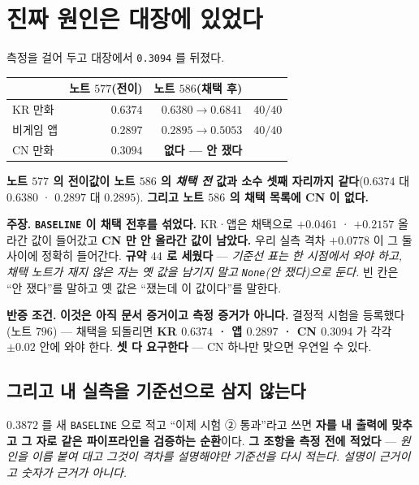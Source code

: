 \documentclass[10pt,a4paper]{article}
\newcommand{\claim}[2]{\begin{claimbox}\textbf{주장.} #1\par\smallskip
  \textcolor{gray!70}{\textbf{반증 조건.} #2}\end{claimbox}}
\begin{document}
\section{진짜 원인은 대장에 있었다}

측정을 걸어 두고 대장에서 \texttt{0.3094} 를 뒤졌다.

\begin{center}
\begin{tabular}{lrrl}
\toprule
& 노트 $577$(전이) & 노트 $586$(채택 후) & \\
\midrule
KR 만화 & $0.6374$ & $0.6380 \to \mathbf{0.6841}$ & $40/40$ \\
비게임 앱 & $0.2897$ & $0.2895 \to \mathbf{0.5053}$ & $40/40$ \\
\textcolor{BrickRed}{CN 만화} & $\mathbf{0.3094}$ & \textcolor{BrickRed}{\textbf{없다 --- 안 쟀다}} & \\
\bottomrule
\end{tabular}
\end{center}

\textbf{노트 $577$ 의 전이값이 노트 $586$ 의 \emph{채택 전} 값과 소수 셋째 자리까지
같다}($0.6374$ 대 $0.6380$ · $0.2897$ 대 $0.2895$). \textbf{그리고 노트 $586$ 의
채택 목록에 CN 이 없다.}

\claim{\textbf{\texttt{BASELINE} 이 채택 전후를 섞었다.} KR·앱은 채택으로
$+0.0461$ · $+0.2157$ 올라간 값이 들어갔고 \textbf{CN 만 안 올라간 값이 남았다.}
우리 실측 격차 $+0.0778$ 이 그 둘 사이에 정확히 들어간다. \textbf{규약 $44$ 로
세웠다} --- \emph{기준선 표는 한 시점에서 와야 하고, 채택 노트가 재지 않은 자는 옛
값을 남기지 말고 \texttt{None}(안 쟀다)으로 둔다.} 빈 칸은 ``안 쟀다''를 말하고 옛
값은 ``쟀는데 이 값이다''를 말한다.}
{\textbf{이것은 아직 문서 증거이고 측정 증거가 아니다.} 결정적 시험을 등록했다
(노트 $796$) --- 채택을 되돌리면 \textbf{KR $0.6374$ · 앱 $0.2897$ · CN $0.3094$}
가 각각 $\pm 0.02$ 안에 와야 한다. \textbf{셋 다 요구한다} --- CN 하나만 맞으면
우연일 수 있다.}

\subsection*{그리고 내 실측을 기준선으로 삼지 않는다}

$0.3872$ 를 새 \texttt{BASELINE} 으로 적고 ``이제 시험 ② 통과''라고 쓰면
\textbf{자를 내 출력에 맞추고 그 자로 같은 파이프라인을 검증하는 순환}이다.
\textbf{그 조항을 측정 전에 적었다} --- \emph{원인을 이름 붙여 대고 그것이 격차를
설명해야만 기준선을 다시 적는다. 설명이 근거이고 숫자가 근거가 아니다.}
\end{document}
